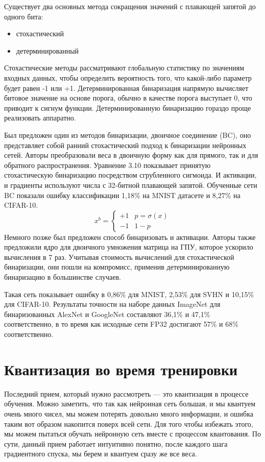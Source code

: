 \documentclass[oneside,final,12pt]{extreport}
\begin{document}
Существует два основных метода сокращения значений с плавающей запятой до одного бита:
\begin{itemize}
    \item стохастический
    \item детерминированный
\end{itemize}

Стохастические методы рассматривают глобальную статистику по значениям входных данных, чтобы определить вероятность того, что какой-либо параметр будет равен -1 или +1. Детерминированная бинаризация напрямую вычисляет битовое значение на основе порога, обычно в качестве порога выступает 0, что приводит к сигнум функции. Детерминированную бинаризацию гораздо проще реализовать аппаратно.

Был предложен один из методов бинаризации, двоичное соединение (BC), оно представляет собой ранний стохастический подход к бинаризации нейронных сетей. Авторы преобразовали веса в двоичную форму как для прямого, так и для обратного распространения. Уравнение 3.10 показывает принятую стохастическую бинаризацию посредством сгрубленного сигмоида. И активации, и градиенты используют числа с 32-битной плавающей запятой. Обученные сети BC показали ошибку классификации 1,18\% на MNIST датасете и 8,27\% на CIFAR-10.
\begin{equation}
    x^b=\left\{\begin{matrix}
    +1 & p=\sigma(x)\\ 
    -1 &  1-p
\end{matrix}\right.
\end{equation}
Немного позже был предложен способ бинаризовать и активации. Авторы также предложили ядро для двоичного умножения матрица на ГПУ, которое ускорило вычисления в 7 раз. Учитывая стоимость вычислений для стохастической бинаризации, они пошли на компромисс, применив детерминированную бинаризацию в большинстве случаев. 

Такая сеть показывает ошибку в 0,86\% для MNIST, 2,53\% для SVHN и 10,15\% для CIFAR-10. Результаты точности на наборе данных ImageNet для бинаризованных AlexNet и GoogleNet составляют 36,1\% и 47,1\% соответственно, в то время как исходные сети FP32 достигают 57\% и 68\% соответственно.

\section{Квантизация во время тренировки}
Последний прием, который нужно рассмотреть — это квантизация в процессе обучения. 
Можно заметить, что так как нейронная сеть большая, и мы квантуем очень много чисел, мы можем потерять довольно много информации, и ошибка таким вот образом накопится поверх всей сети. Для того чтобы избежать этого, мы можем пытаться обучать нейронную сеть вместе с процессом квантования. По сути, данный прием работает интуитивно понятно, после каждого шага градиентного спуска, мы берем и квантуем сразу же все веса.
\end{document}
